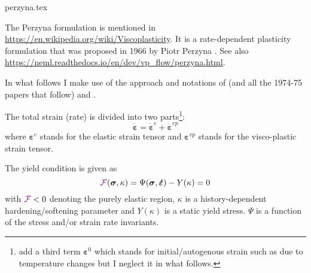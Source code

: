 \begin{flushright} {\tiny {\color{gray} perzyna.tex}} \end{flushright}


The Perzyna formulation is mentioned in \url{
https://en.wikipedia.org/wiki/Viscoplasticity}.
It is a rate-dependent plasticity formulation that was proposed in 1966 by Piotr Perzyna \cite{perz66}.
See also \url{https://neml.readthedocs.io/en/dev/vp_flow/perzyna.html}.



In what follows I make use of the approach and notations of \textcite{zico74} (and all 
the 1974-75 papers that follow) and \textcite{owhi}.

The total strain (rate) is divided into two parts\footnote{\textcite{zico74} 
add a third term ${\bm \varepsilon}^0$ which stands for initial/autogenous strain such as due 
to temperature changes but I neglect it in what follows.}:
\[
\dot{\bm \varepsilon} = \dot{\bm \varepsilon}^e + \dot{\bm \varepsilon}^{vp}  
\]
where ${\bm \varepsilon}^e$ stands for the elastic strain tensor and 
${\bm \varepsilon}^{vp}$ stands for the visco-plastic strain tensor.





The yield condition is given as 
\[
{{\color{violet}\cal F}}({\bm \sigma},\kappa) 
= \Psi(\bm\sigma,\bm{\dot\varepsilon}) -Y(\kappa) = 0
\]
with ${{\color{violet}\cal F}}<0$ denoting the purely elastic region, $\kappa$ is a 
history-dependent hardening/softening parameter and $Y(\kappa)$ is a static yield stress.
$\Psi$ is a function of the stress and/or strain rate invariants.

